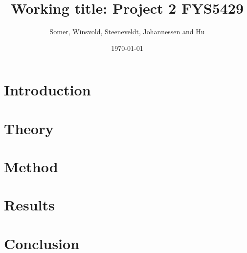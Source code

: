 \documentclass[aps,rmp,preprint,amsmath,amssymb,longbibliography,floatfix]{revtex4-1}
\begin{document}
\title{Working title: Project 2 FYS5429}

\author{Somer, Winsvold, Steeneveldt, Johannessen and Hu}
\date{\today}


\begin{abstract}

\end{abstract}

\maketitle

\tableofcontents

\section{Introduction}
\label{sec:introduction}

\section{Theory}
\label{sec:theory}

\section{Method}
\label{sec:method}

\section{Results}
\label{sec:results}

\section{Conclusion}
\label{sec:conclusion}

\newpage

\appendix

\end{document}
